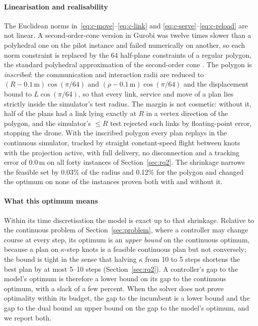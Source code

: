 \documentclass[final,5p,times,twocolumn]{elsarticle}
\begin{document}
\paragraph{Linearisation and realisability}
The Euclidean norms in~\eqref{eq:c-move}--\eqref{eq:c-link} and \eqref{eq:c-serve}--\eqref{eq:c-reload}
are not linear. A second-order-cone version in Gurobi was twelve times slower than a polyhedral one on
the pilot instance and failed numerically on another, so each norm constraint is replaced by the
64 half-plane constraints of a regular polygon, the standard polyhedral approximation of the
second-order cone \cite{bental2001}. The polygon is \emph{inscribed}: the communication and
interaction radii are reduced to $(R - 0.1\,\mathrm{m})\cos(\pi/64)$ and
$(\rho - 0.1\,\mathrm{m})\cos(\pi/64)$ and the displacement bound to $L\cos(\pi/64)$, so that
every link, service and move of a plan lies strictly inside the simulator's test radius. The
margin is not cosmetic: without it, half of the plans had a link lying exactly at $R$ in a
vertex direction of the polygon, and the simulator's $\le R$ test rejected such links by
floating-point error, stopping the drone. With the inscribed polygon every plan replays in the
continuous simulator, tracked by straight constant-speed flight between knots with the projection
active, with full delivery, no disconnection and a tracking error of 0.0\,m on all forty
instances of Section~\ref{sec:rq2}. The shrinkage narrows the feasible set by 0.03\% of the radius
and 0.12\% for the polygon and changed the optimum on none of the instances proven both with and
without it.

\paragraph{What this optimum means}
Within its time discretisation the model is exact up to that shrinkage. Relative to the
continuous problem of Section~\ref{sec:problem}, where a controller may change course at every
step, its optimum is an \emph{upper bound} on the continuous optimum, because a plan on
$\kappa$-step knots is a feasible continuous plan but not conversely; the bound is tight in the
sense that halving $\kappa$ from 10 to 5 steps shortens the best plan by at most 5--10 steps
(Section~\ref{sec:rq2}). A controller's gap to the model's optimum is therefore a lower bound on
its gap to the continuous optimum, with a slack of a few percent. When the solver does not prove optimality within its budget, the gap to the
incumbent is a lower bound and the gap to the dual bound an upper bound on the gap to the model's
optimum, and we report both.
\end{document}
